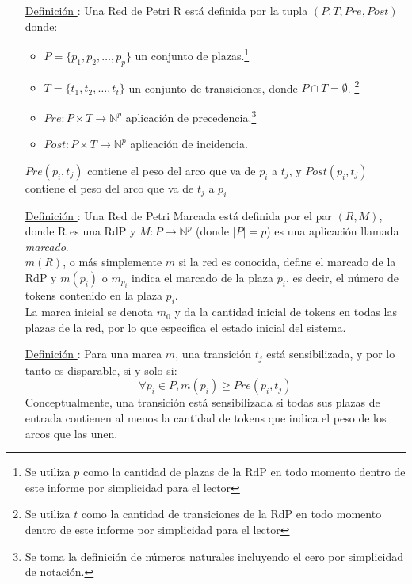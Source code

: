 \begin{itemize}
  \item [\underline{Definición \thedefinitionsCounter}:] Una Red de Petri R está
  definida por la tupla $(P, T, Pre, Post)$ donde:
  \begin{itemize}
    \item $ P = \{ p_1, p_2, \ldots, p_p \} $ un conjunto de plazas.\footnote{Se
    utiliza $p$ como la cantidad de plazas de la RdP en todo momento dentro de este informe por simplicidad para el lector}
    \item $ T = \{ t_1, t_2, \ldots, t_t \} $ un conjunto de transiciones, donde
    $ P \cap T = \emptyset $. \footnote{Se utiliza $t$ como la cantidad de
    transiciones de la RdP en todo momento dentro de este informe por
    simplicidad para el lector}
    \item $ Pre: P \times T \rightarrow \mathbb{N}^{p} $ aplicación de
    precedencia.\footnote{Se toma la definición de números naturales incluyendo
    el cero por simplicidad de notación.}
    \item $ Post: P \times T \rightarrow \mathbb{N}^{p} $ aplicación de
    incidencia.
  \end{itemize}
  $ Pre (p_i, t_j) $ contiene el peso del arco que va de $ p_i $ a $ t_j $, y
  $ Post (p_i, t_j) $ contiene el peso del arco que va de $ t_j $ a $ p_i $

  \item [\underline{Definición \thedefinitionsCounter}:] Una Red de Petri Marcada está
  definida por el par $(R, M)$, donde R es una RdP y $ M : P \rightarrow
  \mathbb{N}^{p}$ (donde $\left\vert{P}\right\vert = p $) es una aplicación
  llamada \textit{marcado}.\\
  $m(R)$, o más simplemente $m$ si la red es conocida, define el marcado de la
  RdP y $m(p_{i})$ o $m_{p_{i}}$ indica el marcado de la plaza $p_{i}$, es
  decir, el número de tokens contenido en la plaza $p_{i}$.\\
  La marca inicial se denota $m_{0}$ y da la cantidad inicial de tokens en todas
  las plazas de la red, por lo que especifica el estado inicial del sistema.
  
  \item [\underline{Definición \thedefinitionsCounter}:] Para una marca $m$, una transición $t_{j}$
  está sensibilizada, y por lo tanto es disparable, si y solo si:\\
  $$ \forall p_{i} \in P, m(p_i) \geq Pre(p_{i}, t_{j}) $$
  Conceptualmente, una transición está sensibilizada si todas sus plazas de
  entrada contienen al menos la cantidad de tokens que indica el peso de los
  arcos que las unen.


\end{itemize}
